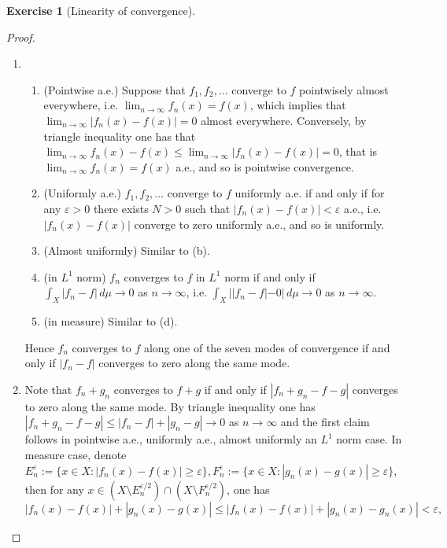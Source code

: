 \documentclass[a4paper]{article}
\newtheorem{ex}{Exercise}[subsection]
\begin{document}
\begin{ex}[Linearity of convergence]\end{ex}\begin{proof}\ 
\begin{enumerate}[label = (\roman*)]
    \item \begin{enumerate}[label = (\alph*)]
        \item (Pointwise a.e.) Suppose that $f_1, f_2, \dots$ converge to $f$ pointwisely almost everywhere, i.e. $\lim_{n \to\infty}
        f_n(x) = f(x)$, which implies that $\lim_{n \to\infty} |f_n(x) - f(x)| = 0$ almost everywhere. Conversely,
        by triangle inequality one has that $\lim_{n \to \infty} f_n(x) - f(x) \leq \lim_{n \to \infty} |f_n(x) - f(x)| = 0$,
        that is $\lim_{n \to\infty} f_n(x) = f(x)$ a.e., and so is pointwise convergence.
        \item (Uniformly a.e.) $f_1, f_2, \dots$ converge to $f$ uniformly a.e. if and only if for any $\varepsilon > 0$
        there exists $N > 0$ such that $|f_n(x) - f(x)| < \varepsilon$ a.e., i.e. $|f_n(x) - f(x)|$ converge to zero
        uniformly a.e., and so is uniformly.
        \item (Almost uniformly) Similar to (b).
        \item (in $L^1$ norm) $f_n$ converges to $f$ in $L^1$ norm if and only if $\int_X |f_n - f|\,d\mu \to 0$ as $n \to 
        \infty$, i.e. $\int_X ||f_n - f| - 0|\,d\mu \to 0$ as $n \to \infty$. 
        \item (in measure) Similar to (d).
    \end{enumerate}
    Hence $f_n$ converges to $f$ along one of the seven modes of convergence if and only if $|f_n - f|$ converges to
    zero along the same mode.
    \item Note that $f_n + g_n$ converges to $f + g$ if and only if $|f_n + g_n - f - g|$ converges to zero along the
    same mode. By triangle inequality one has $|f_n + g_n - f - g| \leq |f_n - f| + |g_n - g| \to 0$ as $n \to \infty$
    and the first claim follows in pointwise a.e., uniformly a.e., almost uniformly an $L^1$ norm case. In measure case, 
    denote $E_n^\varepsilon := \{x \in X : |f_n(x) - f(x)| \geq \varepsilon\}, F_n^\varepsilon := \{x \in X : |g_n(x) - g(x)| \geq \varepsilon\}$,
    then for any $x \in (X\setminus E_n^{\varepsilon/2}) \cap (X \setminus F_n^{\varepsilon /2})$, one has $$
    |f_n(x) - f(x)| + |g_n(x) - g(x)| \leq |f_n(x) - f(x)| + |g_n(x) - g_n(x)| < \varepsilon,
$$
\end{enumerate}
\end{proof}
\end{document}
